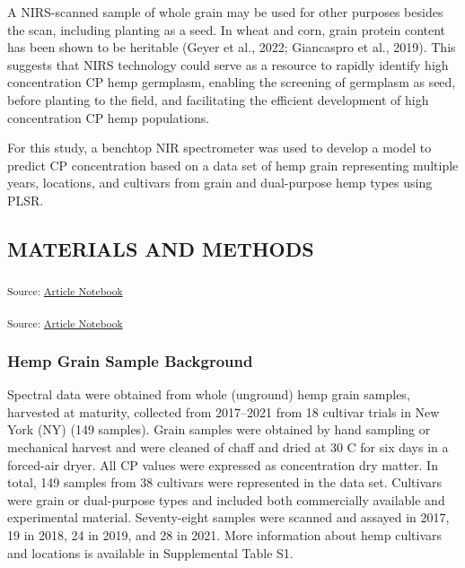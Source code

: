 \documentclass[
]{agujournal2019}
\begin{document}
A NIRS-scanned sample of whole grain may be used for other purposes
besides the scan, including planting as a seed. In wheat and corn, grain
protein content has been shown to be heritable (Geyer et al., 2022;
Giancaspro et al., 2019). This suggests that NIRS technology could serve
as a resource to rapidly identify high concentration CP hemp germplasm,
enabling the screening of germplasm as seed, before planting to the
field, and facilitating the efficient development of high concentration
CP hemp populations.

For this study, a benchtop NIR spectrometer was used to develop a model
to predict CP concentration based on a data set of hemp grain
representing multiple years, locations, and cultivars from grain and
dual-purpose hemp types using PLSR.

\subsection{MATERIALS AND METHODS}\label{materials-and-methods}

\textsubscript{Source:
\href{https://rvcrawford.github.io/glowing-system/index.qmd.html}{Article
Notebook}}

\textsubscript{Source:
\href{https://rvcrawford.github.io/glowing-system/index.qmd.html}{Article
Notebook}}

\subsubsection{Hemp Grain Sample
Background}\label{hemp-grain-sample-background}

Spectral data were obtained from whole (unground) hemp grain samples,
harvested at maturity, collected from 2017--2021 from 18 cultivar trials
in New York (NY) (149 samples). Grain samples were obtained by hand
sampling or mechanical harvest and were cleaned of chaff and dried at 30
C for six days in a forced-air dryer. All CP values were expressed as
concentration dry matter. In total, 149 samples from 38 cultivars were
represented in the data set. Cultivars were grain or dual-purpose types
and included both commercially available and experimental material.
Seventy-eight samples were scanned and assayed in 2017, 19 in 2018, 24
in 2019, and 28 in 2021. More information about hemp cultivars and
locations is available in Supplemental Table S1.
\end{document}
